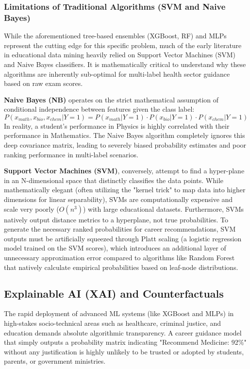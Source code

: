 \subsubsection{Limitations of Traditional Algorithms (SVM and Naive Bayes)}
While the aforementioned tree-based ensembles (XGBoost, RF) and MLPs represent the cutting edge for this specific problem, much of the early literature in educational data mining heavily relied on Support Vector Machines (SVM) and Naive Bayes classifiers. It is mathematically critical to understand why these algorithms are inherently sub-optimal for multi-label \parencite{tsoumakas2007multi} health sector guidance based on raw exam scores.

\textbf{Naive Bayes (NB)} operates on the strict mathematical assumption of conditional independence between features given the class label:
\[
P(x_{math}, x_{bio}, x_{chem} | Y=1) = P(x_{math}|Y=1) \cdot P(x_{bio}|Y=1) \cdot P(x_{chem}|Y=1)
\]
In reality, a student's performance in Physics is highly correlated with their performance in Mathematics. The Naive Bayes algorithm completely ignores this deep covariance matrix, leading to severely biased probability estimates and poor ranking performance in multi-label \parencite{tsoumakas2007multi} scenarios.

\textbf{Support Vector Machines (SVM)}, conversely, attempt to find a hyper-plane in an N-dimensional space that distinctly classifies the data points. While mathematically elegant (often utilizing the "kernel trick" to map data into higher dimensions for linear separability), SVMs are computationally expensive and scale very poorly ($O(n^3)$) with large educational datasets. Furthermore, SVMs natively output distance metrics to a hyperplane, not true probabilities. To generate the necessary ranked probabilities for career recommendations, SVM outputs must be artificially squeezed through Platt scaling (a logistic regression model trained on the SVM scores), which introduces an additional layer of unnecessary approximation error compared to algorithms like Random Forest \parencite{breiman2001random} that natively calculate empirical probabilities based on leaf-node distributions.

\subsection{Explainable AI (XAI) and Counterfactuals}

The rapid deployment of advanced ML systems (like XGBoost \parencite{chen2016xgboost} and MLPs) in high-stakes socio-technical areas such as healthcare, criminal justice, and education demands absolute algorithmic transparency. A career guidance model that simply outputs a probability matrix indicating "Recommend Medicine: 92\%" without any justification is highly unlikely to be trusted or adopted by students, parents, or government ministries.

